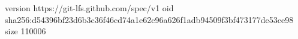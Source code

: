 version https://git-lfs.github.com/spec/v1
oid sha256:d54396bf23d6b3c36f46cd74a1e62c96a626f1adb94509f3bf473177de53ce98
size 110006
